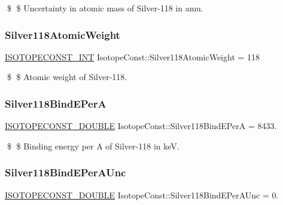 \$ \$ Uncertainty in atomic mass of Silver-\/118 in amu. \mbox{\label{group___isotope_const-_silver-_ag118_ga196e399723c71ad761a9649eabfd4225}} 
\subsubsection{\texorpdfstring{Silver118\+Atomic\+Weight}{Silver118AtomicWeight}}
{\footnotesize\ttfamily \mbox{\hyperlink{group___isotope_const-_macros_ga5f18360b3e99483a35c32d789e62621c}{I\+S\+O\+T\+O\+P\+E\+C\+O\+N\+S\+T\+\_\+\+I\+NT}} Isotope\+Const\+::\+Silver118\+Atomic\+Weight = 118}

\$ \$ Atomic weight of Silver-\/118. \mbox{\label{group___isotope_const-_silver-_ag118_ga17900c9a94f0bb8eed6727a47da7f7df}} 
\subsubsection{\texorpdfstring{Silver118\+Bind\+E\+PerA}{Silver118BindEPerA}}
{\footnotesize\ttfamily \mbox{\hyperlink{group___isotope_const-_macros_ga8f45a7272ce02c0b4c65c44636ed719a}{I\+S\+O\+T\+O\+P\+E\+C\+O\+N\+S\+T\+\_\+\+D\+O\+U\+B\+LE}} Isotope\+Const\+::\+Silver118\+Bind\+E\+PerA = 8433.}

\$ \$ Binding energy per A of Silver-\/118 in keV. \mbox{\label{group___isotope_const-_silver-_ag118_ga9e5604207a4ea553257f6607ac1919e6}} 
\subsubsection{\texorpdfstring{Silver118\+Bind\+E\+Per\+A\+Unc}{Silver118BindEPerAUnc}}
{\footnotesize\ttfamily \mbox{\hyperlink{group___isotope_const-_macros_ga8f45a7272ce02c0b4c65c44636ed719a}{I\+S\+O\+T\+O\+P\+E\+C\+O\+N\+S\+T\+\_\+\+D\+O\+U\+B\+LE}} Isotope\+Const\+::\+Silver118\+Bind\+E\+Per\+A\+Unc = 0.}

